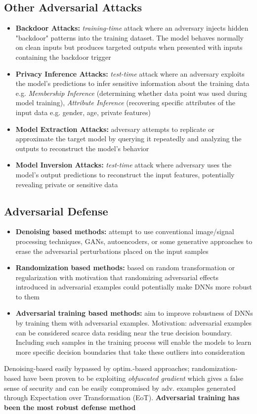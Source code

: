 \subsection{Other Adversarial Attacks}
\begin{itemize}
    \item \textbf{Backdoor Attacks:} \emph{training-time} attack where an adversary injects hidden "backdoor" patterns into the training dataset. The model behaves normally on clean inputs but produces targeted outputs when presented with inputs containing the backdoor trigger
    \item \textbf{Privacy Inference Attacks:} \emph{test-time} attack where an adversary exploits the model's predictions to infer sensitive information about the training data e.g. \emph{Membership Inference} (determining whether data point was used during model training), \emph{Attribute Inference} (recovering specific attributes of the input data e.g. gender, age, private features)
    \item \textbf{Model Extraction Attacks:} adversary attempts to replicate or approximate the target model by querying it repeatedly and analyzing the outputs to reconstruct the model's behavior
    \item \textbf{Model Inversion Attacks:} \emph{test-time} attack where adversary uses the model's output predictions to reconstruct the input features, potentially revealing private or sensitive data
\end{itemize}

\subsection{Adversarial Defense}
\begin{itemize}
    \item \textbf{Denoising based methods:} attempt to use conventional image/signal processing techniques, GANs, autoencoders, or some generative approaches to erase the adversarial perturbations placed on the input samples
    \item \textbf{Randomization based methods:} based on random transformation or regularization with motivation that randomizing adversarial effects introduced in adversarial examples could potentially make DNNs more robust to them
    \item \textbf{Adversarial training based methods:} aim to improve robustness of DNNs by training them with adversarial examples. Motivation: adversarial examples can be considered scarce data residing near the true decision boundary. Including such samples in the training process will enable the models to learn more specific decision boundaries that take these outliers into consideration
\end{itemize}
Denoising-based easily bypassed by optim.-based approaches; randomization-based have been proven to be exploiting \emph{obfuscated gradient} which gives a false sense of security and can be easily compromised by adv. examples generated through Expectation over Transformation (EoT). \textbf{Adversarial training has been the most robust defense method}